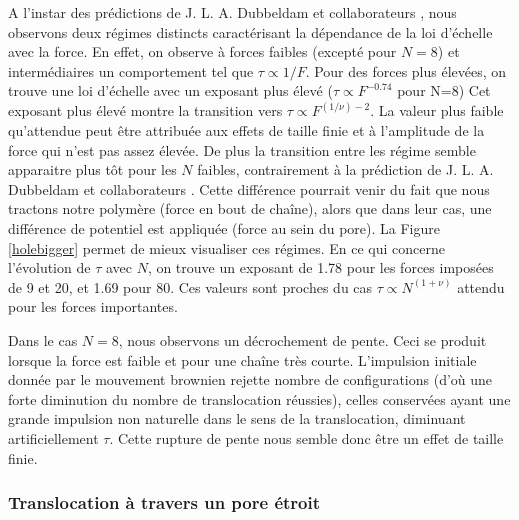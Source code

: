 \documentclass[a4paper,11pt]{article}
\begin{document}
A l'instar des prédictions de J. L. A. Dubbeldam et collaborateurs \cite{traction}, nous observons deux régimes distincts caractérisant la dépendance de la loi d'échelle avec la force. En effet, on observe à forces faibles (excepté pour $N=8$) et intermédiaires un comportement tel que $\tau \propto 1/F$. Pour des forces plus élevées, on trouve une loi d'échelle avec un exposant plus élevé ($\tau \propto F^{-0.74}$ pour N=8) Cet exposant plus élevé montre la transition vers $\tau \propto F^{(1/\nu) -2}$. La valeur plus faible qu'attendue peut être attribuée aux effets de taille finie et à l'amplitude de la force qui n'est pas assez élevée. De plus la transition entre les régime semble apparaitre plus tôt pour les $N$ faibles, contrairement à la prédiction de J. L. A. Dubbeldam et collaborateurs \cite{traction}. Cette différence pourrait venir du fait que nous tractons notre polymère (force en bout de chaîne), alors que dans leur cas, une différence de potentiel est appliquée (force au sein du pore). La Figure \ref{holebigger} permet de mieux visualiser ces régimes. En ce qui concerne l'évolution de $\tau$ avec $N$, on trouve un exposant de 1.78 pour les forces imposées de 9 et 20, et 1.69 pour 80. Ces valeurs sont proches du cas $\tau \propto N^{(1+\nu)}$ attendu pour les forces importantes.

Dans le cas $N=8$, nous observons un décrochement de pente. Ceci se produit lorsque la force est faible et pour une chaîne très courte. L'impulsion initiale donnée par le mouvement brownien rejette nombre de configurations (d’où une forte diminution du nombre de translocation réussies), celles conservées ayant une grande impulsion non naturelle dans le sens de la translocation, diminuant artificiellement $\tau$. Cette rupture de pente nous semble donc être un effet de taille finie.



\subsubsection{Translocation à travers un pore étroit}
\end{document}
